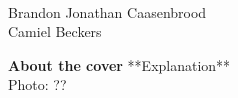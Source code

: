 \graphicspath{{0_FrontMatter/Figures/}}

\begingroup
\setlength{\parindent}{0pt}

%
\thispagestyle{empty}
\vspace*{3cm}
\begin{center}
\iftuefont
\huge{\tuefontscala\selectfont\maintitle}\\[15mm]%
\Large{\tuefontscala\selectfont Brandon Jonathan Caasenbrood}
\else
\huge{\sffamily\bfseries\selectfont\maintitle}\\[15mm]%
\Large{\sffamily\selectfont Camiel Beckers}
\fi
\end{center}

\newpage
\thispagestyle{empty}
\textbf{About the cover}
**Explanation**\\
{\footnotesize Photo: ??}

\vspace*{\fill}



